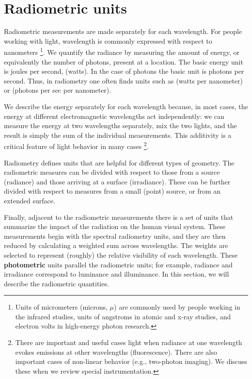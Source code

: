 \documentclass[
  letterpaper,
]{book}
\begin{document}
\section{Radiometric units}\label{radiometric-units}

Radiometric measurements are made separately for each wavelength. For
people working with light, wavelength is commonly expressed with respect
to nanometers \footnote{Units of micrometers (microns, \(\mu\)) are
  commonly used by people working in the infrared studies, units of
  angstroms in atomic and x-ray studies, and electron volts in
  high-energy photon research.}. We quantify the radiance by measuring
the amount of energy, or equivalently the number of photons, present at
a location. The basic energy unit is joules per second, (watts). In the
case of photons the basic unit is photons per second. Thus, in
radiometry one often finds units such as (watts per nanometer) or
(photons per sec per nanometer).

We describe the energy separately for each wavelength because, in most
cases, the energy at different electromagnetic wavelengths act
independently: we can measure the energy at two wavelengths separately,
mix the two lights, and the result is simply the sum of the individual
measurements. This additivity is a critical feature of light behavior in
many cases \footnote{There are important and useful cases light when
  radiance at one wavelength evokes emissions at other wavelengths
  (fluorescence). There are also important cases of non-linear behavior
  (e.g., two-photon imaging). We discuss these when we review special
  instrumentation.}.

Radiometry defines units that are helpful for different types of
geometry. The radiometric measures can be divided with respect to those
from a source (radiance) and those arriving at a surface (irradiance).
These can be further divided with respect to measures from a small
(point) source, or from an extended surface.

Finally, adjacent to the radiometric measurements there is a set of
units that summarize the impact of the radiation on the human visual
system. These measurements begin with the spectral radiometry units, and
they are then reduced by calculating a weighted sum across wavelengths.
The weights are selected to represent (roughly) the relative visibility
of each wavelength. These \textbf{photometric} units parallel the
radiometric units; for example, radiance and irradiance correspond to
luminance and illuminance. In this section, we will describe the
radiometric quantities.
\end{document}
